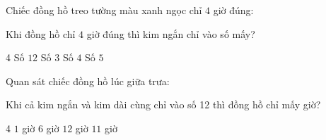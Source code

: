 \begin{ex} %
Chiếc đồng hồ treo tường màu xanh ngọc chỉ $4$ giờ đúng:
\begin{center}\vspace{-2mm}
\vspace{-2mm}\end{center}
Khi đồng hồ chỉ $4$ giờ đúng thì kim ngắn chỉ vào số mấy?
\begin{multicols}{4}
\choice
{Số $12$}
{Số $3$}
{\True Số $4$}
{Số $5$}
\end{multicols}
\end{ex}

\begin{ex} %
Quan sát chiếc đồng hồ lúc giữa trưa:
\begin{center}\vspace{-2mm}
\vspace{-2mm}\end{center}
Khi cả kim ngắn và kim dài cùng chỉ vào số 12 thì đồng hồ chỉ mấy giờ?
\begin{multicols}{4}
\choice
{$1$ giờ}
{$6$ giờ}
{\True $12$ giờ}
{$11$ giờ}
\end{multicols}
\end{ex}

\newpage

